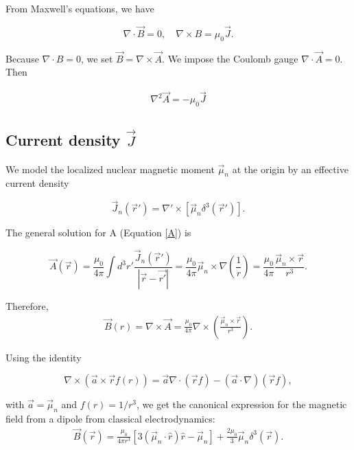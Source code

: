 \documentclass[svgnames]{article}
\begin{document}
From Maxwell's equations, we have 

\[
    \nabla \cdot \vec{B} = 0, \quad \nabla \times B = \mu_0 \vec{J}.
\] \vspace{3px}

Because $\nabla \cdot B = 0$, we set $\vec{B} = \nabla \times \vec{A}$. We
impose the Coulomb gauge $\nabla \cdot \vec{A} = 0$. Then 

\begin{align} \label{A}
\nabla^2 \vec{A} = -\mu_0 \vec{J}
\end{align}

\subsection{Current density $\vec{J}$}

We model the localized nuclear magnetic moment $\vec{\mu}_n$ at the origin by an
effective current density

\[
    \vec{J}_n (\vec{r}') = \nabla' \times [\vec{\mu}_n \delta^3(\vec{r}')]. 
\] \vspace{3px}

The general solution for A (Equation \ref{A}) is 

\[
\vec{A}(\vec{r}) = \frac{\mu_0}{4\pi} \int d^3 r'
\frac{\vec{J}_n(\vec{r}')}{|\vec{r}-\vec{r'}|} = \frac{\mu_0}{4\pi}\vec{\mu}_n
\times \nabla\left( \frac{1}{r} \right) = \frac{\mu_0}{4\pi}\frac{\vec{\mu}_n
\times \vec{r}}{r^3}.   
\] 

Therefore, 
\begin{align} \label{}
    \vec{B}(r) = \nabla \times \vec{A} = \frac{\mu_0}{4\pi}\nabla \times \left(
    \frac{\vec{\mu}_n \times \vec{r}}{r^3}\right).   
\end{align}

Using the identity 

\[
\nabla \times (\vec{a} \times \vec{r}f(r)) = \vec{a}\nabla \cdot (\vec{r}f) -
(\vec{a}\cdot \nabla)(\vec{r}f), 
\] \vspace{3px}

with $\vec{a} = \vec{\mu}_n$ and $f(r) = 1/r^3$, we get the canonical expression
for the magnetic field from a dipole from classical electrodynamics: 
\begin{align} \label{B}
      \vec{B}(\vec{r}) = \frac{\mu_0}{4\pi r^3} \left[ 3(\vec{\mu}_n \cdot
      \hat{r})\hat{r} - \vec{\mu}_n \right] + \frac{2\mu_0}{3}\vec{\mu}_n
      \delta^3(\vec{r}). 
\end{align}
\end{document}
